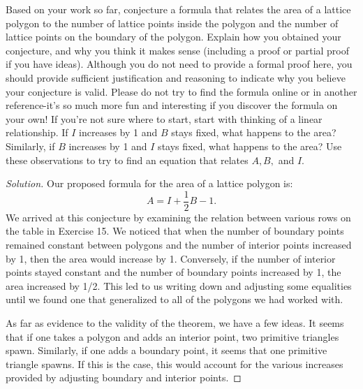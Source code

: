 \documentclass[12pt]{article}
\newenvironment{exercise}[2][Exercise]{\begin{trivlist}
        \item[\hskip \labelsep {\bfseries #1}\hskip \labelsep {\bfseries #2.}]}{\end{trivlist}}
\newenvironment{solution}
        {\begin{proof}[Solution]}
                    {\end{proof}}
\begin{document}
\begin{exercise}{18}
    Based on your work so far, conjecture a formula that relates the area of a lattice polygon to the number of lattice points inside the polygon and the number of lattice points on the boundary of the polygon. Explain how you obtained your conjecture, and why you think it makes sense (including a proof or partial proof if you have ideas). Although you do not need to provide a formal proof here, you should provide sufficient justification and reasoning to indicate why you believe your conjecture is valid. Please do not try to find the formula online or in another reference-it's so much more fun and interesting if you discover the formula on your own! If you're not sure where to start, start with thinking of a linear relationship. If \( I \) increases by 1 and \( B \) stays fixed, what happens to the area? Similarly, if \( B \) increases by 1 and \( I \) stays fixed, what happens to the area? Use these observations to try to find an equation that relates \( A, B, \) and \( I. \)
    \begin{solution}
        Our proposed formula for the area of a lattice polygon is:
        $$ A = I + \frac{1}{2} B -1.$$
        We arrived at this conjecture by examining the relation between various rows on the table in Exercise 15. We noticed that when the number of boundary points remained constant between polygons and the number of interior points increased by 1, then the area would increase by 1. Conversely, if the number of interior points stayed constant and the number of boundary points increased by 1, the area increased by 1/2. This led to us writing down and adjusting some equalities until we found one that generalized to all of the polygons we had worked with.

        As far as evidence to the validity of the theorem, we have a few ideas. It seems that if one takes a polygon and adds an interior point, two primitive triangles spawn. Similarly, if one adds a boundary point, it seems that one primitive triangle spawns. If this is the case, this would account for the various increases provided by adjusting boundary and interior points.
    \end{solution}
\end{exercise}
\end{document}
